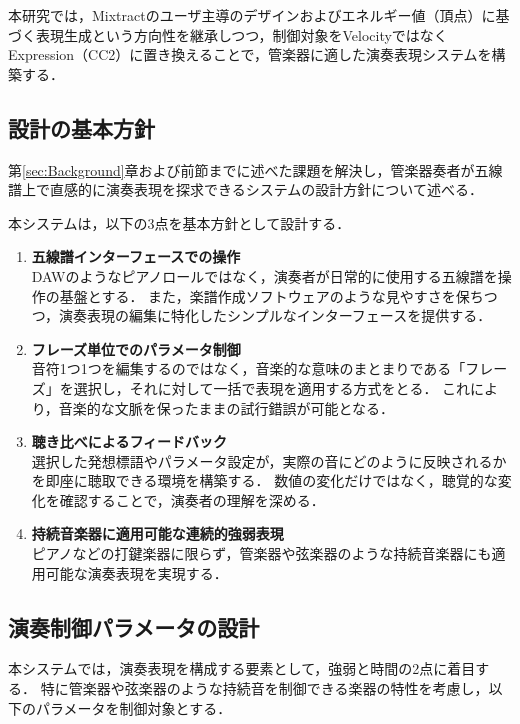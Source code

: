 本研究では，Mixtractのユーザ主導のデザインおよびエネルギー値（頂点）に基づく表現生成という方向性を継承しつつ，制御対象をVelocityではなくExpression（CC2）に置き換えることで，管楽器に適した演奏表現システムを構築する．

\subsection{設計の基本方針}
第\ref{sec:Background}章および前節までに述べた課題を解決し，管楽器奏者が五線譜上で直感的に演奏表現を探求できるシステムの設計方針について述べる．

本システムは，以下の3点を基本方針として設計する．

\begin{enumerate}
	\item \textbf{五線譜インターフェースでの操作}\\
	      DAWのようなピアノロールではなく，演奏者が日常的に使用する五線譜を操作の基盤とする．
	      また，楽譜作成ソフトウェアのような見やすさを保ちつつ，演奏表現の編集に特化したシンプルなインターフェースを提供する．
	\item \textbf{フレーズ単位でのパラメータ制御}\\
	      音符1つ1つを編集するのではなく，音楽的な意味のまとまりである「フレーズ」を選択し，それに対して一括で表現を適用する方式をとる．
	      これにより，音楽的な文脈を保ったままの試行錯誤が可能となる．
	\item \textbf{聴き比べによるフィードバック}\\
	      選択した発想標語やパラメータ設定が，実際の音にどのように反映されるかを即座に聴取できる環境を構築する．
	      数値の変化だけではなく，聴覚的な変化を確認することで，演奏者の理解を深める．
	\item \textbf{持続音楽器に適用可能な連続的強弱表現}\\
	      ピアノなどの打鍵楽器に限らず，管楽器や弦楽器のような持続音楽器にも適用可能な演奏表現を実現する．
\end{enumerate}

\subsection{演奏制御パラメータの設計}
本システムでは，演奏表現を構成する要素として，強弱と時間の2点に着目する．
特に管楽器や弦楽器のような持続音を制御できる楽器の特性を考慮し，以下のパラメータを制御対象とする．

